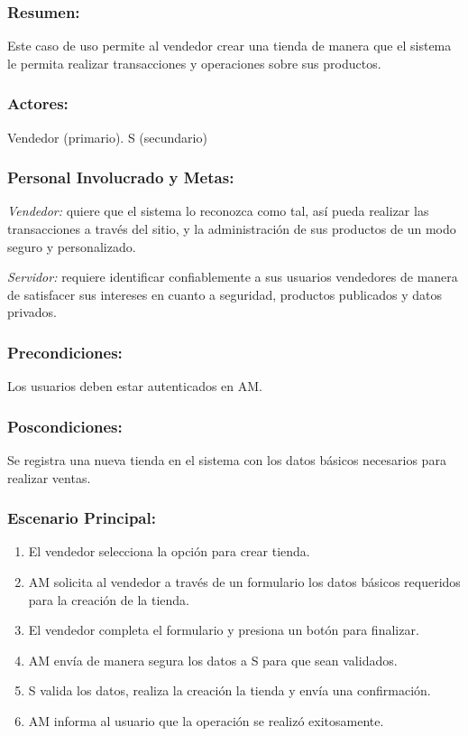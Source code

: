 \begin{framed}


\subsubsection{Resumen:} Este caso de uso permite al vendedor crear una tienda de manera que el sistema le permita realizar transacciones y operaciones sobre sus productos.


\subsubsection{Actores:} Vendedor (primario). S (secundario)

\subsubsection{Personal Involucrado y Metas:}

\emph{Vendedor:} quiere que el sistema lo reconozca como tal, así pueda realizar las transacciones a través del sitio, y la administración de sus productos de un modo seguro y personalizado.

\emph{Servidor:} requiere identificar confiablemente a sus usuarios vendedores de manera de satisfacer sus intereses en cuanto a seguridad, productos publicados y datos privados. 

\subsubsection{Precondiciones:} 
Los usuarios deben estar autenticados en AM. 

\subsubsection{Poscondiciones:} 
Se registra una nueva tienda en el sistema con los datos básicos necesarios para realizar ventas.

\subsubsection{Escenario Principal: }

\begin{enumerate}
    \item El vendedor selecciona la opción para crear tienda. 
    \item AM solicita al vendedor a través de un formulario los datos básicos requeridos para la creación de la tienda.
    \item El vendedor completa el formulario y presiona un botón para finalizar.
    \item AM envía de manera segura los datos a S para que sean validados.
    \item S valida los datos, realiza la creación la tienda y envía una confirmación.
    \item AM informa al usuario que la operación se realizó exitosamente.
\end{enumerate}


\end{framed}
